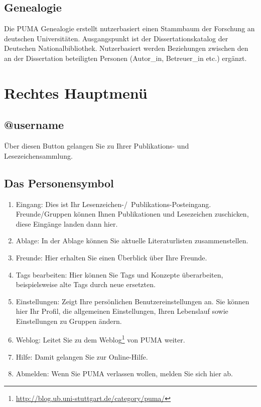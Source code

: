 \subsection{Genealogie}
Die PUMA Genealogie erstellt nutzerbasiert einen Stammbaum der Forschung an deutschen Universitäten. Ausgangspunkt ist der Dissertationskatalog der Deutschen Nationalbibliothek. Nutzerbasiert werden Beziehungen zwischen den an der Dissertation beteiligten Personen (Autor\_in, Betreuer\_in etc.) ergänzt.

\section{Rechtes Hauptmenü}
\subsection{@username}
Über diesen Button gelangen Sie zu Ihrer Publikations- und Lesezeichensammlung. 
\subsection{Das Personensymbol}
\begin{enumerate}
    \item Eingang: Dies ist Ihr Lesenzeichen-/~Publikations-Posteingang. Freunde/Gruppen können Ihnen Publikationen und Lesezeichen zuschicken, diese Eingänge landen dann hier.
    \item Ablage: In der Ablage können Sie aktuelle Literaturlisten zusammenstellen. 
    \item Freunde: Hier erhalten Sie einen Überblick über Ihre Freunde. 
    \item Tags bearbeiten: Hier können Sie Tags und Konzepte überarbeiten, beispielsweise alte Tags durch neue ersetzten. 
    \item Einstellungen: Zeigt Ihre persönlichen Benutzereinstellungen an. Sie können hier Ihr Profil, die allgemeinen Einstellungen, Ihren Lebenslauf sowie Einstellungen zu Gruppen ändern.
    \item Weblog: Leitet Sie zu dem Weblog\footnote{\url{http://blog.ub.uni-stuttgart.de/category/puma/}} von PUMA weiter.
    \item Hilfe: Damit gelangen Sie zur Online-Hilfe.
    \item Abmelden: Wenn Sie PUMA verlassen wollen, melden Sie sich hier ab. 
\end{enumerate}

